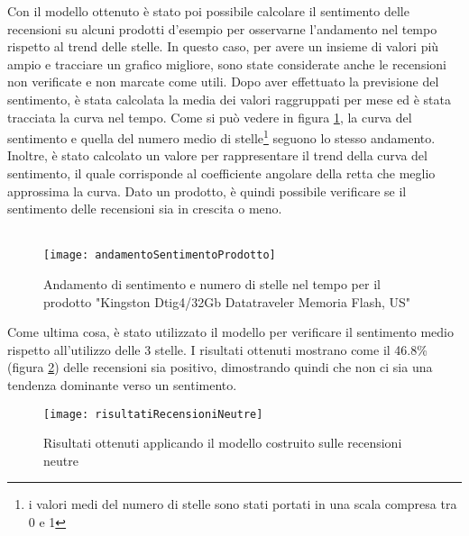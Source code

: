 Con il modello ottenuto è stato poi possibile calcolare il sentimento delle recensioni su alcuni prodotti d'esempio per osservarne l'andamento nel tempo rispetto al trend delle stelle. In questo caso, per avere un insieme di valori più ampio e tracciare un grafico migliore, sono state considerate anche le recensioni non verificate e non marcate come utili. Dopo aver effettuato la previsione del sentimento, è stata calcolata la media dei valori raggruppati per mese ed è stata tracciata la curva nel tempo. Come si può vedere in figura \ref{fig:andamentoSentimentoProdotto}, la curva del sentimento e quella del numero medio di stelle\footnote{i valori medi del numero di stelle sono stati portati in una scala compresa tra 0 e 1} seguono lo stesso andamento. Inoltre, è stato calcolato un valore per rappresentare il trend della curva del sentimento, il quale corrisponde al coefficiente angolare della retta che meglio approssima la curva. Dato un prodotto, è quindi possibile verificare se il sentimento delle recensioni sia in crescita o meno. \\\\

\begin{figure}[H]
    \texttt{[image: andamentoSentimentoProdotto]}\centering
    \caption{Andamento di sentimento e numero di stelle nel tempo per il prodotto "Kingston Dtig4/32Gb Datatraveler Memoria Flash, US"}\label{fig:andamentoSentimentoProdotto}
\end{figure}



Come ultima cosa, è stato utilizzato il modello per verificare il sentimento medio rispetto all'utilizzo delle 3 stelle. I risultati ottenuti mostrano come il 46.8\% (figura \ref{fig:torta}) delle recensioni sia positivo, dimostrando quindi che non ci sia una tendenza dominante verso un sentimento.


\begin{figure}[H]
    \texttt{[image: risultatiRecensioniNeutre]}\centering
    \caption{Risultati ottenuti applicando il modello costruito sulle recensioni neutre}\label{fig:torta}
\end{figure}

